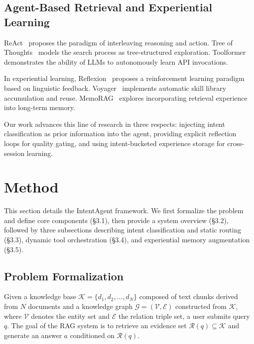 \documentclass[runningheads]{llncs}
\begin{document}
\subsection{Agent-Based Retrieval and Experiential Learning}

ReAct~\cite{ref13} proposes the paradigm of interleaving reasoning and action. Tree of Thoughts~\cite{ref14} models the search process as tree-structured exploration. Toolformer~\cite{ref15} demonstrates the ability of LLMs to autonomously learn API invocations.

In experiential learning, Reflexion~\cite{ref16} proposes a reinforcement learning paradigm based on linguistic feedback. Voyager~\cite{ref17} implements automatic skill library accumulation and reuse. MemoRAG~\cite{ref18} explores incorporating retrieval experience into long-term memory.

Our work advances this line of research in three respects: injecting intent classification as prior information into the agent, providing explicit reflection loops for quality gating, and using intent-bucketed experience storage for cross-session learning.

\section{Method}

This section details the IntentAgent framework. We first formalize the problem and define core components (\S3.1), then provide a system overview (\S3.2), followed by three subsections describing intent classification and static routing (\S3.3), dynamic tool orchestration (\S3.4), and experiential memory augmentation (\S3.5).

\subsection{Problem Formalization}

Given a knowledge base $\mathcal{K} = \{d_1, d_2, \ldots, d_N\}$ composed of text chunks derived from $N$ documents and a knowledge graph $\mathcal{G} = (\mathcal{V}, \mathcal{E})$ constructed from $\mathcal{K}$, where $\mathcal{V}$ denotes the entity set and $\mathcal{E}$ the relation triple set, a user submits query $q$. The goal of the RAG system is to retrieve an evidence set $\mathcal{R}(q) \subseteq \mathcal{K}$ and generate an answer $a$ conditioned on $\mathcal{R}(q)$.
\end{document}

